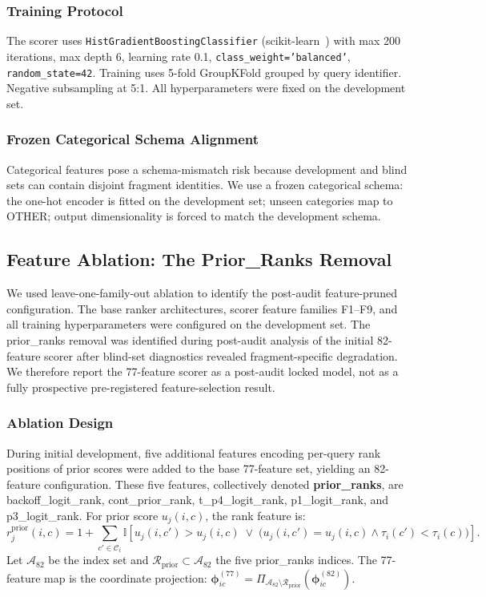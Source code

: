 \documentclass[12pt,letterpaper]{article}
\begin{document}
\subsubsection{Training Protocol}

The scorer uses \texttt{HistGradientBoostingClassifier} (scikit-learn~\cite{pedregosa2011scikit}) with max 200 iterations, max depth 6, learning rate 0.1, \texttt{class\_weight='balanced'}, \texttt{random\_state=42}. Training uses 5-fold GroupKFold grouped by query identifier. Negative subsampling at 5:1. All hyperparameters were fixed on the development set.

\subsubsection{Frozen Categorical Schema Alignment}

Categorical features pose a schema-mismatch risk because development and blind sets can contain disjoint fragment identities. We use a frozen categorical schema: the one-hot encoder is fitted on the development set; unseen categories map to OTHER; output dimensionality is forced to match the development schema.

\subsection{Feature Ablation: The Prior\_Ranks Removal}

We used leave-one-family-out ablation to identify the post-audit feature-pruned configuration. The base ranker architectures, scorer feature families F1--F9, and all training hyperparameters were configured on the development set. The prior\_ranks removal was identified during post-audit analysis of the initial 82-feature scorer after blind-set diagnostics revealed fragment-specific degradation. We therefore report the 77-feature scorer as a post-audit locked model, not as a fully prospective pre-registered feature-selection result.

\subsubsection{Ablation Design}

During initial development, five additional features encoding per-query rank positions of prior scores were added to the base 77-feature set, yielding an 82-feature configuration. These five features, collectively denoted \textbf{prior\_ranks}, are backoff\_logit\_rank, cont\_prior\_rank, t\_p4\_logit\_rank, p1\_logit\_rank, and p3\_logit\_rank. For prior score $u_j(i,c)$, the rank feature is:
%
\begin{equation}
r_j^{\mathrm{prior}}(i,c) = 1 + \sum_{c'\in\mathcal{C}_i} \mathbb{I}\!\left[ u_j(i,c')>u_j(i,c) \;\lor\; \bigl(u_j(i,c')=u_j(i,c)\land \tau_i(c')<\tau_i(c)\bigr) \right].
\end{equation}
%
Let $\mathcal{A}_{82}$ be the index set and $\mathcal{R}_{\mathrm{prior}} \subset \mathcal{A}_{82}$ the five prior\_ranks indices. The 77-feature map is the coordinate projection: $\boldsymbol{\phi}^{(77)}_{ic} = \Pi_{\mathcal{A}_{82}\setminus\mathcal{R}_{\mathrm{prior}}}(\boldsymbol{\phi}^{(82)}_{ic})$.
\end{document}
